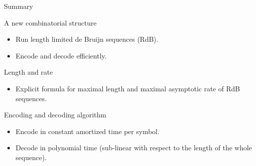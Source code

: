 \begin{frame}{Summary}
    \begin{block}{A new combinatorial structure}
        \begin{itemize}
            \item Run length limited de Bruijn sequences (RdB).
            \item Encode and decode efficiently.
        \end{itemize}
    \end{block}
    
    \begin{block}{Length and rate}
        \begin{itemize}
            \item Explicit formula for maximal length and maximal asymptotic rate of RdB sequences.
        \end{itemize}
    \end{block}
    
    \begin{block}{Encoding and decoding algorithm}
        \begin{itemize}
            \item Encode in constant amortized time per symbol.
            \item Decode in polynomial time (sub-linear with respect to the length of the whole sequence).
        \end{itemize}
    \end{block}
\end{frame}


